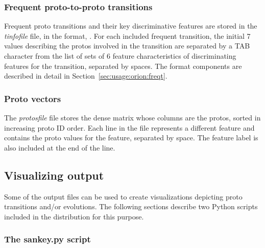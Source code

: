 \documentclass[]{article}
\begin{document}
\subsubsection{Frequent proto-to-proto transitions}
\label{sec:usage:oformat:tinfo}

Frequent proto transitions and their key discriminative features are stored in
the \emph{tinfofile} file, in the format,\newline
.\newline
For each included frequent transition, the initial 7 values describing the
protos involved in the transition are separated by a TAB character from the list
of sets of 6 feature characteristics of discriminating features for the
transition, separated by spaces. The format components are described in detail
in Section~\ref{sec:usage:orion:freqt}.

\subsubsection{Proto vectors}
\label{sec:usage:oformat:protos}

The \emph{protosfile} file stores the dense matrix whose columns are the protos,
sorted in increasing proto ID order. Each line in the file represents a
different feature and contains the proto values for the feature, separated by space. The
feature label is also included at the end of the line.


\subsection{Visualizing \orion output}
\label{sec:usage:viz}

Some of the \orionp output files can be used to create visualizations depicting
proto transitions and/or evolutions. The following sections describe
two Python scripts included in the \orion distribution for this purpose.

\subsubsection{The sankey.py script}
\label{sec:usage:viz:sankey} 
\end{document}
